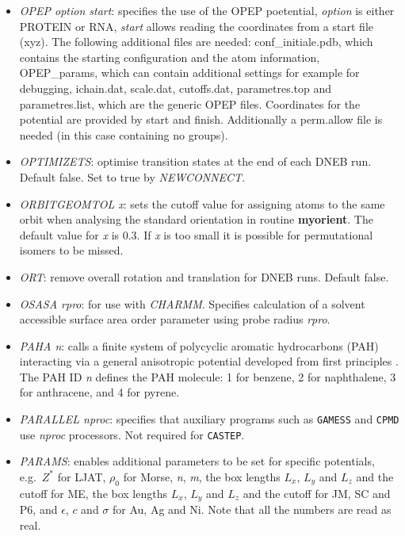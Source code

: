 \documentclass[12pt,a4paper,dvips]{article}
\begin{document}
\begin{itemize}
\item {\it OPEP option start\/}: specifies the use of the OPEP poetential, {\it option\/} is either PROTEIN or RNA, {\it start\/} allows reading the coordinates from a start file (xyz). The following additional files are needed:
{\textrm conf\_initiale.pdb}, which contains the starting configuration and the atom information, {\textrm OPEP\_params}, which can contain additional settings for example for debugging,
{\textrm ichain.dat}, {\textrm scale.dat}, {\textrm cutoffs.dat}, {\textrm parametres.top} and {\textrm parametres.list}, which are the generic OPEP files.
Coordinates for the potential are provided by {\textrm start} and {\textrm finish}. Additionally a {\textrm perm.allow} file is needed (in this case containing no groups).

\item {\it OPTIMIZETS\/}: optimise transition states at the end of each DNEB run.
Default false. Set to true by {\it NEWCONNECT\/}.

\item {\it ORBITGEOMTOL x\/}: sets the cutoff value for assigning atoms to the
same orbit when analysing the standard orientation in routine {\bf myorient}.
The default value for {\it x\/} is 0.3.
If {\it x} is too small it is possible for permutational isomers to be missed.

\item {\it ORT\/}: remove overall rotation and translation for DNEB runs. Default false.

\item {\it OSASA rpro\/}: for use with {\it CHARMM\/}. Specifies calculation of
a solvent accessible surface area order parameter using probe radius {\it rpro\/}.

\item {\it PAHA n\/}: calls a finite system of polycyclic aromatic hydrocarbons (PAH) interacting
via a general anisotropic potential developed from first principles \cite{TottonMK10}. The PAH ID
{\it n} defines the PAH molecule: 1 for benzene, 2 for naphthalene, 3 for anthracene, and 4 for
pyrene.

\item {\it PARALLEL nproc\/}: specifies that auxiliary programs such as {\tt GAMESS} and
{\tt CPMD} use {\it nproc\/} processors. Not required for {\tt CASTEP}.

\item {\it PARAMS\/}: enables additional parameters to be set for
specific potentials, e.g.~$Z^*$ for LJAT, $\rho_0$ for Morse, {\it n\/}, {\it m\/}, the
box lengths $L_x$, $L_y$ and $L_z$ and the cutoff for ME, the
box lengths $L_x$, $L_y$ and $L_z$ and the cutoff for JM, SC and P6,
and $\epsilon$, $c$ and $\sigma$ for Au, Ag and Ni. Note that all the
numbers are read as real.


\end{itemize}
\end{document}
